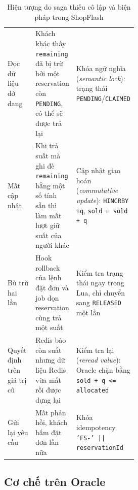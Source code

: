 \begin{table}[H]
\centering
\caption{Hiện tượng do saga thiếu cô lập và biện pháp trong ShopFlash}\label{tab:cc-saga}
\reporttablesetup
\begin{tabularx}{\linewidth}{|P{0.22\linewidth}|L|P{0.29\linewidth}|}
\hline
{}
 &  &  \\ \hline
Đọc dữ liệu dở dang & Khách khác thấy \texttt{remaining} đã bị trừ bởi một reservation còn \texttt{PENDING}, có thể sẽ được trả lại & Khóa ngữ nghĩa (\emph{semantic lock}): trạng thái \texttt{PENDING}/\texttt{CLAIMED} \\ \hline
Mất cập nhật & Khi trả suất mà ghi đè \texttt{remaining} bằng một số tính sẵn thì làm mất lượt giữ suất của người khác & Cập nhật giao hoán (\emph{commutative update}): \texttt{HINCRBY +q}, \texttt{sold = sold + q} \\ \hline
Bù trừ hai lần & Hook rollback của lệnh đặt đơn và job dọn reservation cùng trả một suất & Kiểm tra trạng thái ngay trong Lua, chỉ chuyển sang \texttt{RELEASED} một lần \\ \hline
Quyết định trên giá trị cũ & Redis báo còn suất nhưng dữ liệu Redis vừa mất rồi được dựng lại & Kiểm tra lại (\emph{reread value}): Oracle chặn bằng \texttt{sold + q <= allocated} \\ \hline
Gửi lại yêu cầu & Mất phản hồi, khách bấm đặt đơn lần nữa & Khóa idempotency \texttt{'FS-' || reservationId} \\ \hline
\end{tabularx}
\end{table}

\subsection{Cơ chế trên Oracle}\label{sec:cc-oracle}

